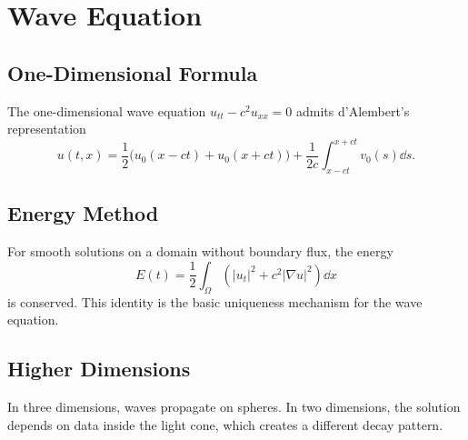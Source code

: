 
\chapter{Wave Equation}

\section{One-Dimensional Formula}

The one-dimensional wave equation \(u_{tt}-c^2u_{xx}=0\) admits d'Alembert's representation
\[
  u(t,x)=\frac{1}{2}\bigl(u_0(x-ct)+u_0(x+ct)\bigr)
  +\frac{1}{2c}\int_{x-ct}^{x+ct} v_0(s)\dd s.
\]

\section{Energy Method}

For smooth solutions on a domain without boundary flux, the energy
\[
  E(t)=\frac{1}{2}\int_\Omega \left(|u_t|^2+c^2|\nabla u|^2\right)\dd x
\]
is conserved. This identity is the basic uniqueness mechanism for the wave equation.

\section{Higher Dimensions}

In three dimensions, waves propagate on spheres. In two dimensions, the solution depends on data inside the light cone, which creates a different decay pattern.
